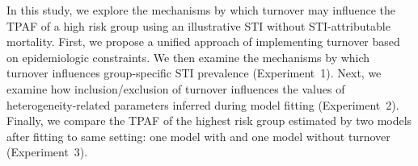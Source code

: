 
\par
In this study, we explore the mechanisms by which turnover     %
may influence the TPAF of a high risk group			%
using an illustrative STI without STI-attributable mortality.
First, we propose a unified approach of implementing turnover based on epidemiologic constraints.
We then examine the mechanisms by which turnover
influences group-specific STI prevalence
(Experiment~1).
Next, we examine how inclusion/exclusion of turnover influences
the values of heterogeneity-related parameters inferred during model fitting
(Experiment~2).
Finally, we compare the TPAF of the highest risk group
estimated by two models after fitting to same setting:
one model with and one model without turnover
(Experiment~3).